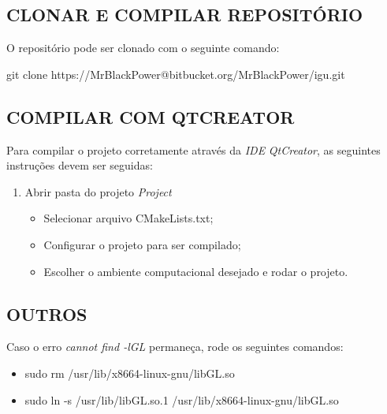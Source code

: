 \begin{appendices}
	\section{CLONAR E COMPILAR REPOSITÓRIO}\label{compile}
	
	O repositório pode ser clonado com o seguinte comando:
	
	git clone https://MrBlackPower@bitbucket.org/MrBlackPower/igu.git
	
	
	
	\subsection{COMPILAR COM QTCREATOR}\label{qtcreator}
	
	Para compilar o projeto corretamente através da \textit{IDE} \textit{QtCreator}, as seguintes instruções devem ser seguidas:
	
	\begin{enumerate}
		\item Abrir pasta do projeto \textit{Project}
		\begin{itemize}
			\item Selecionar arquivo CMakeLists.txt;
			\item Configurar o projeto para ser compilado;
			\item Escolher o ambiente computacional desejado e rodar o projeto.
		\end{itemize}
	\end{enumerate}
	
	\subsection{OUTROS}\label{cmake}
	
	Caso o erro \textit{cannot find -lGL} permaneça, rode os seguintes comandos:
	
	\begin{itemize}
		\item sudo rm /usr/lib/x86\underline{\space\space}64-linux-gnu/libGL.so
		\item sudo ln -s /usr/lib/libGL.so.1 /usr/lib/x86\underline{\space\space}64-linux-gnu/libGL.so
	\end{itemize}
	

\end{appendices}
